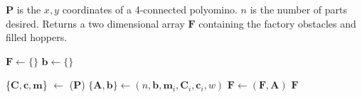 \begin{algorithm} 
\newcommand\algotext[1]{\end{algorithmic}#1\begin{algorithmic}[1]}
\caption{ ($\mathbf{P}, n$)\label{alg:BuildFactory}}
$\mathbf{P}$ is the $x,y$ coordinates of a 4-connected polyomino.  $n$ is the number of parts desired. 
Returns a two dimensional array $ \mathbf{F} $ containing the factory obstacles and filled hoppers.
\begin{algorithmic}[1]
\State$\mathbf{F} \leftarrow \{\}$  
\State$ \mathbf{b} \leftarrow \{\}$  

\State \{$\mathbf{C},\mathbf{c}, \mathbf{m}$\} $  \leftarrow$ {}($\mathbf{P}$)
\State$\{ \mathbf{A}, \mathbf{b} \}\leftarrow${}$(n,\mathbf{b}, \mathbf{m}_i,\mathbf{C}_i, \mathbf{c}_i,w)$
\State$ \mathbf{F} \leftarrow${}$(\mathbf{F},\mathbf{A})$
\EndFor
 \EndIf 
\State \Return  $ \mathbf{F} $
\end{algorithmic}
\end{algorithm} 
 
 
 

 
 
